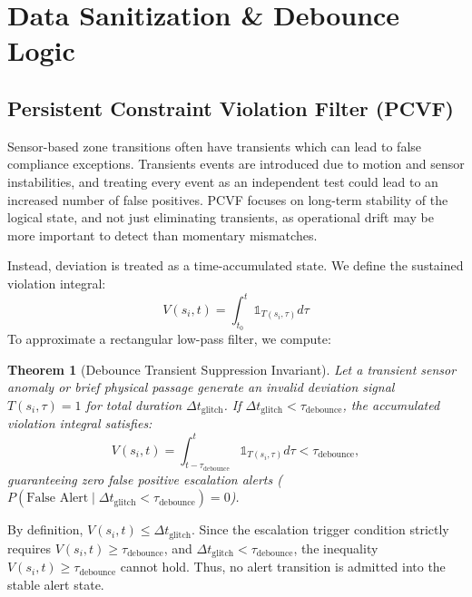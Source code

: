 \documentclass[conference]{IEEEtran}
\newtheorem{theorem}{Theorem}
\begin{document}
\section{Data Sanitization \& Debounce Logic}

\subsection{Persistent Constraint Violation Filter (PCVF)}
Sensor-based zone transitions often have transients which can lead to false compliance exceptions. Transients events are introduced due to motion and sensor instabilities, and treating every event as an independent test could lead to an increased number of false positives. PCVF focuses on long-term stability of the logical state, and not just eliminating transients, as operational drift may be more important to detect than momentary mismatches.

Instead, deviation is treated as a time-accumulated state. We define the sustained violation integral:
\begin{equation}
V(s_i,t) = \int_{t_0}^{t} \mathbb{1}_{T(s_i,\tau)} d\tau
\end{equation}
To approximate a rectangular low-pass filter, we compute:
\begin{theorem}[Debounce Transient Suppression Invariant]
Let a transient sensor anomaly or brief physical passage generate an invalid deviation signal $T(s_i, \tau) = 1$ for total duration $\Delta t_{\mathrm{glitch}}$. If $\Delta t_{\mathrm{glitch}} < \tau_{\mathrm{debounce}}$, the accumulated violation integral satisfies:
\begin{equation}
V(s_i, t) = \int_{t-\tau_{\mathrm{debounce}}}^t \mathbb{1}_{T(s_i, \tau)} d\tau < \tau_{\mathrm{debounce}},
\end{equation}
guaranteeing zero false positive escalation alerts ($P(\text{False Alert} \mid \Delta t_{\mathrm{glitch}} < \tau_{\mathrm{debounce}}) = 0$).
\end{theorem}

\begin{IEEEproof}
By definition, $V(s_i, t) \le \Delta t_{\mathrm{glitch}}$. Since the escalation trigger condition strictly requires $V(s_i, t) \ge \tau_{\mathrm{debounce}}$, and $\Delta t_{\mathrm{glitch}} < \tau_{\mathrm{debounce}}$, the inequality $V(s_i, t) \ge \tau_{\mathrm{debounce}}$ cannot hold. Thus, no alert transition is admitted into the stable alert state.
\end{IEEEproof}
\end{document}
